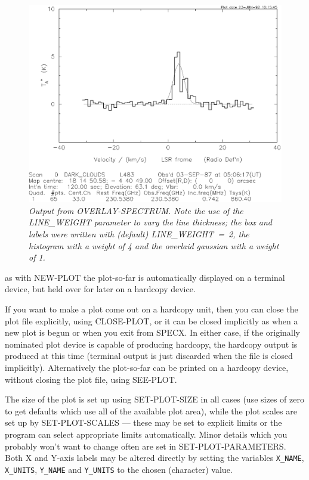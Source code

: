 \documentclass[11pt,twoside]{report}
\begin{document}
\begin{figure}[htbp]
\begin{center}
\includegraphics[scale=0.65]{overlay.ps}
\protect\parbox{5.5in}
{\caption[PLOT]
{\sl
Output from OVERLAY-SPECTRUM. Note the use of the LINE\_WEIGHT
parameter to vary the line thickness; the box and labels were written
with (default) LINE\_WEIGHT~=~2, the histogram with a weight of 4
and the overlaid gaussian with a weight of 1.
\label{PLOT}
}
}
\end{center}
\end{figure}
as with NEW-PLOT the plot-so-far is automatically displayed on a
terminal device, but held over for later on a hardcopy device.

If you want to make a plot come out on a hardcopy unit, then
you can close the plot file explicitly, using CLOSE-PLOT, or it can be closed
implicitly as when a new plot is begun or when you exit from SPECX. In either
case, if the originally nominated plot device is capable of producing hardcopy,
the hardcopy output is produced at this time (terminal output is just discarded
when the file is closed implicitly). Alternatively the plot-so-far can be
printed on a hardcopy device, without closing the plot file, using SEE-PLOT.

The size of the plot
is set up using SET-PLOT-SIZE in all cases (use sizes of zero to get
defaults which use all of the available plot area), while the plot scales
are set up by SET-PLOT-SCALES --- these may be set to explicit limits or the
program can select appropriate limits automatically. Minor details which you
probably won't want to change often are set in SET-PLOT-PARAMETERS.
Both X and Y-axis labels may be altered directly by setting the variables
\verb+X_NAME+, \verb+X_UNITS+, \verb+Y_NAME+ and \verb+Y_UNITS+ to the chosen
(character) value.
\end{document}
